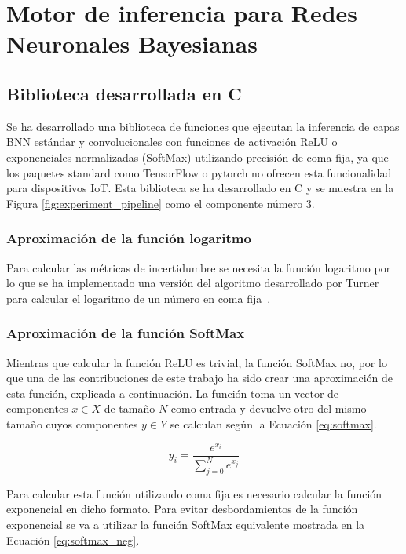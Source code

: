 \chapter{Motor de inferencia para Redes Neuronales Bayesianas} \label{ch:motor_inferencia}

\section{Biblioteca desarrollada en C}

Se ha desarrollado una biblioteca de funciones que ejecutan la inferencia de capas BNN estándar y convolucionales con funciones de activación ReLU o exponenciales normalizadas (SoftMax) utilizando precisión de coma fija, ya que los paquetes standard como TensorFlow o pytorch no ofrecen esta funcionalidad para dispositivos IoT. Esta biblioteca se ha desarrollado en C y se muestra en la Figura \ref{fig:experiment_pipeline} como el componente número 3.

\subsection{Aproximación de la función logaritmo}

Para calcular las métricas de incertidumbre se necesita la función logaritmo por lo que se ha implementado una versión del algoritmo desarrollado por Turner para calcular el logaritmo de un número en coma fija~\cite{binary_log}.

\subsection{Aproximación de la función SoftMax}

Mientras que calcular la función ReLU es trivial, la función SoftMax no, por lo que una de las contribuciones de este trabajo ha sido crear una aproximación de esta función, explicada a continuación. La función toma un vector de componentes $x \in X$ de tamaño $N$ como entrada y devuelve otro del mismo tamaño cuyos componentes $y\in Y$ se calculan según la Ecuación \ref{eq:softmax}.

\begin{equation} \label{eq:softmax}
y_i = \dfrac{e^{x_i}}{\sum_{j = 0}^N e^{x_j}}
\end{equation}

Para calcular esta función utilizando coma fija es necesario calcular la función exponencial en dicho formato. Para evitar desbordamientos de la función exponencial se va a utilizar la función SoftMax equivalente mostrada en la Ecuación \ref{eq:softmax_neg}.

